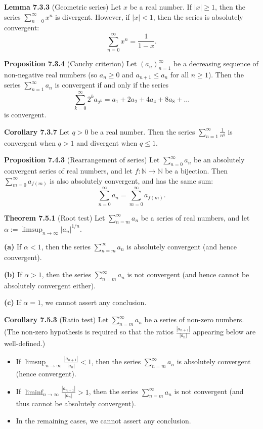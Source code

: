 \documentclass{article}
\begin{document}
\medskip

\textbf{Lemma 7.3.3} (Geometric series) Let $x$ be a real number.
If $|x| \geq 1$, then the series $\sum_{n=0}^{\infty} x^n$ is divergent.
However, if $|x| < 1$, then the series is absolutely convergent:
\[
    \sum_{n=0}^{\infty} x^n = \frac{1}{1 - x}.
\]

\medskip

\textbf{Proposition 7.3.4} (Cauchy criterion) Let $(a_n)_{n=1}^{\infty}$ be a
decreasing sequence of non-negative real numbers (so $a_n \geq 0$ and
$a_{n+1} \leq a_n$ for all $n \geq 1$).
Then the series $\sum_{n=1}^{\infty} a_n$ is convergent if and only if the
series
\[
    \sum_{k=0}^{\infty} 2^k a_{2^k} = a_1 + 2a_2 + 4a_4 + 8a_8 + \dots
\]
is convergent.

\medskip

\textbf{Corollary 7.3.7} Let $q > 0$ be a real number. Then the series
$\sum_{n=1}^{\infty} \frac{1}{n^q}$ is convergent when $q > 1$ and divergent
when $q \leq 1$.

\medskip

\textbf{Proposition 7.4.3} (Rearrangement of series) Let $\sum_{n=0}^{\infty} a_n$
be an absolutely convergent series of real numbers, and let $f: \mathbb{N} \to \mathbb{N}$
be a bijection.
Then $\sum_{m=0}^{\infty} a_{f(m)}$ is also absolutely convergent, and has the
same sum:
\[
    \sum_{n=0}^{\infty} a_n = \sum_{m=0}^{\infty} a_{f(m)}.
\]

\medskip


\textbf{Theorem 7.5.1} (Root test) Let $\sum_{n=m}^{\infty} a_n$ be a series of real
numbers, and let $\alpha := \limsup_{n \to \infty} |a_n|^{1/n}$.

\textbf{(a)} If $\alpha < 1$, then the series $\sum_{n=m}^{\infty} a_n$ is absolutely
convergent (and hence convergent).

\textbf{(b)} If $\alpha > 1$, then the series $\sum_{n=m}^{\infty} a_n$ is not
convergent (and hence cannot be absolutely convergent either).

\textbf{(c)} If $\alpha = 1$, we cannot assert any conclusion.


\medskip


\textbf{Corollary 7.5.3} (Ratio test) Let $\sum_{n=m}^{\infty} a_n$ be a series of
non-zero numbers. (The non-zero hypothesis is required so that the ratios
$\frac{|a_{n+1}|}{|a_n|}$ appearing below are well-defined.)

\begin{itemize}
    \item If $\limsup_{n \to \infty} \frac{|a_{n+1}|}{|a_n|} < 1$, then the series
          $\sum_{n=m}^{\infty} a_n$ is absolutely convergent (hence convergent).

    \item If $\liminf_{n \to \infty} \frac{|a_{n+1}|}{|a_n|} > 1$, then the series
          $\sum_{n=m}^{\infty} a_n$ is not convergent (and thus cannot be absolutely
          convergent).

    \item In the remaining cases, we cannot assert any conclusion.
\end{itemize}
\end{document}
